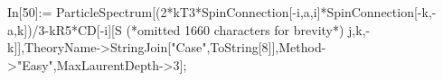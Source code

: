 In[50]:= ParticleSpectrum[(2*kT3*SpinConnection[-i,a,i]*SpinConnection[-k,-a,k])/3-kR5*CD[-i][S (*omitted 1660 characters for brevity*) j,k,-k]],TheoryName->StringJoin["Case",ToString[8]],Method->"Easy",MaxLaurentDepth->3];